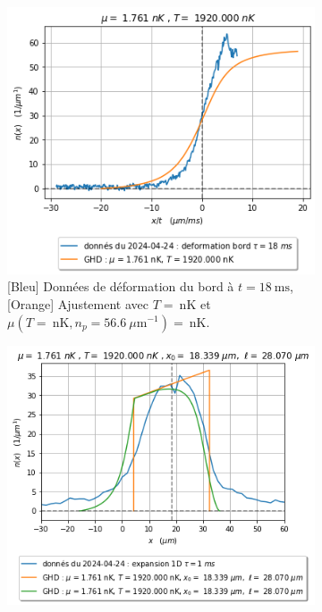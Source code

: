 \documentclass[a3, 10pt,twoside]{article}          %
\theoremstyle{plain}
\theoremstyle{definition}
\theoremstyle{remark}
\theoremstyle{definition} %
\begin{document}
	
	\begin{figure}[H]
    \begin{subfigure}[b]{0.32\textwidth}
        \centering
        \includegraphics[width=\textwidth]{Figures/simul_deformation_expansion}
        \caption{{\color{blue} [Bleu] Données de déformation du bord à $t = 18~\text{ms}$}, {\color{orange}[Orange] Ajustement avec $T = ~\text{nK}$ et $\mu(T = ~\text{nK}, n_p = 56.6~\mu \text{m}^{-1}) = ~\text{nK}$}.}
        \label{simul_deformation_expansion}
    \end{subfigure}
    \hfill
    \begin{subfigure}[b]{0.32\textwidth}
        \centering
        \includegraphics[width=\textwidth]{Figures/simul_expansion_1_expansion}

\end{subfigure}
\end{figure}
\end{document}
